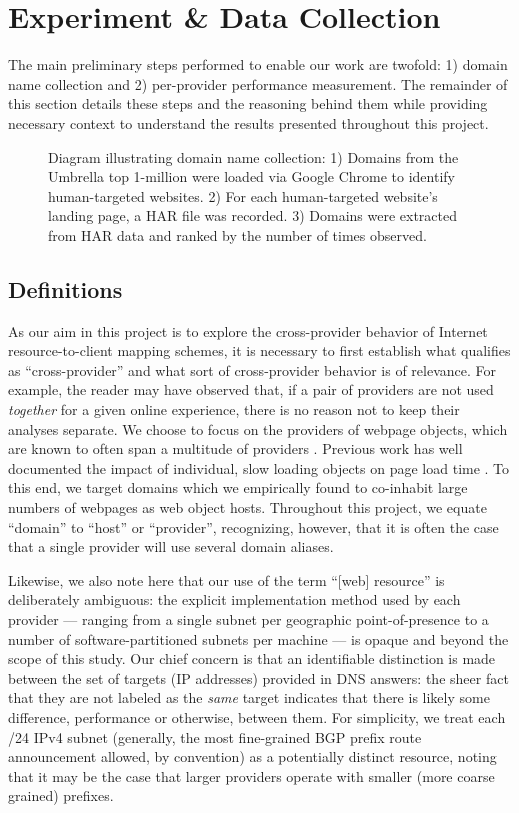 \section{Experiment \& Data Collection} \label{oversky}

The main preliminary steps performed to enable our work are twofold: 1) domain name collection and 2) per-provider performance measurement. The remainder of this section details these steps and the reasoning behind them while providing necessary context to understand the results presented throughout this project. 

\begin{figure}
    \caption{Diagram illustrating domain name collection: 1) Domains from the Umbrella top 1-million were loaded via Google Chrome to identify human-targeted websites. 2) For each human-targeted website's landing page, a HAR file was recorded. 3) Domains were extracted from HAR data and ranked by the number of times observed.
    }
    \label{fig:domfind}
\end{figure}

\subsection{Definitions}

As our aim in this project is to explore the cross-provider behavior of Internet
resource-to-client mapping schemes, it is necessary to first establish what
qualifies as ``cross-provider'' and what sort of cross-provider behavior is of
relevance. For example, the reader may have observed that, if a pair of
providers are not used \emph{together} for a given online experience, there
is no reason not to keep their analyses separate. We choose to focus on the providers of webpage objects, which are known
to often span a multitude of providers \cite{butkiewicz2011}. Previous work has well documented
the impact of individual, slow loading objects on page load time \cite{wang2013}. To this
end, we target domains which we empirically found to co-inhabit large numbers of
webpages as web object hosts. Throughout this project, we equate ``domain'' to
``host'' or ``provider'', recognizing, however, that it is often the case that a
single provider will use several domain aliases. 

Likewise, we also note here that our use of the term ``[web] resource'' is
deliberately ambiguous: the explicit implementation method used by each provider
--- ranging from a single subnet per geographic point-of-presence to a number of
software-partitioned subnets per machine --- is opaque and beyond the scope of
this study. Our chief concern is that an identifiable distinction is made
between the set of targets (IP addresses) provided in DNS answers: the sheer fact that they are not
labeled as the \emph{same} target indicates that there is likely some difference,
performance or otherwise, between them. For simplicity, we treat
each /24 IPv4 subnet (generally, the most fine-grained BGP prefix route
announcement allowed, by convention) as a potentially distinct resource, noting
that it may be the case that larger providers operate with smaller (more coarse
grained) prefixes.

